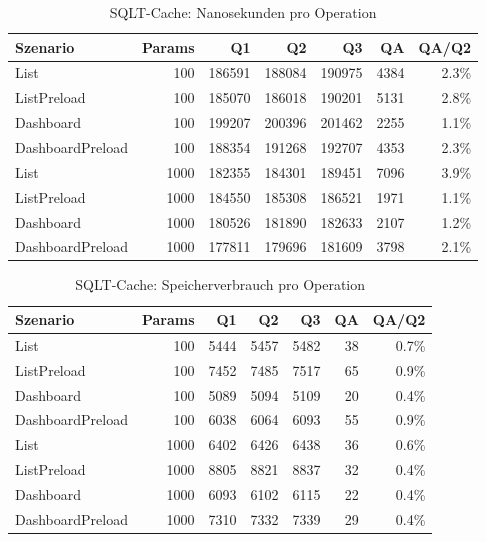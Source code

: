 
\begin{table}[ht]
\caption{SQLT-Cache: Nanosekunden pro Operation}
\begin{tabular}{lrrrrrr}
\toprule
Szenario & Params & Q1 & Q2 & Q3 & QA & QA/Q2 \\
\midrule
	List & 100 & 186591 & 188084 & 190975 & 4384 & 2.3\% \\
	ListPreload & 100 & 185070 & 186018 & 190201 & 5131 & 2.8\% \\
	Dashboard & 100 & 199207 & 200396 & 201462 & 2255 & 1.1\% \\
	DashboardPreload & 100 & 188354 & 191268 & 192707 & 4353 & 2.3\% \\
	List & 1000 & 182355 & 184301 & 189451 & 7096 & 3.9\% \\
	ListPreload & 1000 & 184550 & 185308 & 186521 & 1971 & 1.1\% \\
	Dashboard & 1000 & 180526 & 181890 & 182633 & 2107 & 1.2\% \\
	DashboardPreload & 1000 & 177811 & 179696 & 181609 & 3798 & 2.1\% \\
\bottomrule
\end{tabular}
\label{tab:benchmark_sqlt-cache_nsperop}
\end{table}
	
\begin{table}[ht]
\caption{SQLT-Cache: Speicherverbrauch pro Operation}
\begin{tabular}{lrrrrrr}
\toprule
Szenario & Params & Q1 & Q2 & Q3 & QA & QA/Q2 \\
\midrule
	List & 100 & 5444 & 5457 & 5482 & 38 & 0.7\% \\
	ListPreload & 100 & 7452 & 7485 & 7517 & 65 & 0.9\% \\
	Dashboard & 100 & 5089 & 5094 & 5109 & 20 & 0.4\% \\
	DashboardPreload & 100 & 6038 & 6064 & 6093 & 55 & 0.9\% \\
	List & 1000 & 6402 & 6426 & 6438 & 36 & 0.6\% \\
	ListPreload & 1000 & 8805 & 8821 & 8837 & 32 & 0.4\% \\
	Dashboard & 1000 & 6093 & 6102 & 6115 & 22 & 0.4\% \\
	DashboardPreload & 1000 & 7310 & 7332 & 7339 & 29 & 0.4\% \\
\bottomrule
\end{tabular}
\label{tab:benchmark_sqlt-cache_bytesperop}
\end{table}
	
